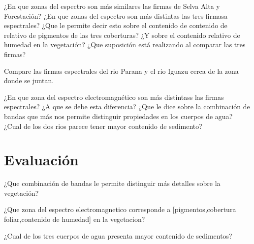 \documentclass[a4paper,12pt]{book}
\begin{document}
\begin{que}
    ¿En que zonas del espectro son más similares las firmas de Selva Alta y Forestación? ¿En que zonas del espectro son más distintas las tres firmasa espectrales? ¿Que le permite decir esto sobre el contenido de contenido de relativo de pigmentos de las tres coberturas? ¿Y sobre el contenido relativo de humedad en la vegetación? ¿Que suposición está realizando al comparar las tres firmas?
\end{que}

Compare las firmas espectrales del rio Parana y el rio Iguazu cerca de la zona donde se juntan.

\begin{que}
    ¿En que zona del espectro electromagnético son más distintass las firmas espectrales? ¿A que se debe esta diferencia? ¿Que le dice sobre la combinación de bandas que más nos permite distinguir propiedades en los cuerpos de agua? ¿Cual de los dos rios parece tener mayor contenido de sedimento?
\end{que}

\section{Evaluación}

\begin{que}
    ¿Que combinación de bandas le permite distinguir más detalles sobre la vegetación?
\end{que}

\begin{que}
    ¿Que zona del espectro electromagnetico corresponde a [pigmentos,cobertura foliar,contenido de humedad] en la vegetacion?
\end{que}

\begin{que}
    ¿Cual de los tres cuerpos de agua presenta mayor contenido de sedimentos?
\end{que}
\end{document}
